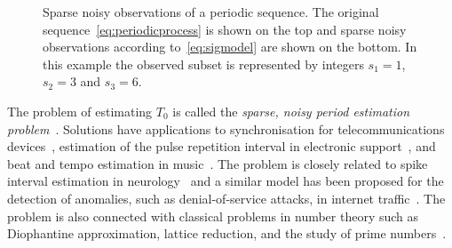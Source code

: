 \documentclass[10pt,twocolumn,twoside]{IEEEtran}
\begin{document}
{
\def\vertgap{2}
\def\ph{0.4}
\def\T{1.1}
\newcommand{\raxis}{\draw[->] (-0.25,0) -- (8,0) node[above] {$\reals$}; \draw (0,-0.06)-- node[below] {$0$} (0,0.06) }
\newcommand{\pulse}[1]{ \draw[->,>=latex] (#1,0) -- (#1,1) }
\newcommand{\pulsewithnode}[2]{ \draw[->,>=latex] (#1,0) -- node[right] {#2} (#1,1) }
\begin{figure}[t]
	\centering
{} 
		\caption{Sparse noisy observations of a periodic sequence.  The original sequence~\eqref{eq:periodicprocess} is shown on the top and sparse noisy observations according to~\eqref{eq:sigmodel} are shown on the bottom.  In this example the observed subset is represented by integers $s_1=1$, $s_2=3$ and $s_3=6$.}
		\label{fig_stat_model}
\end{figure}
}

The problem of estimating $T_0$ is called the \emph{sparse, noisy period estimation problem}~\cite{Clarkson2007,McKilliam2007}.  Solutions have applications to synchronisation for telecommunications devices~\cite{Fogel1988,Fogel1989_bit_synch_zero_crossings,Sidiropoulos2005,5621928}, estimation of the pulse repetition interval in electronic support~\cite{EltonGray_puilse_train_rader_1994,Gray_more_pri_1994,Clarkson_thesis,clarkson_estimate_period_pulse_train_1996,Hauochan_pri_2012}, and beat and tempo estimation in music~\cite{dixon_beat_extraction_2001}.  The problem is closely related to spike interval estimation in neurology~\cite{Arnett_neuro_pri_1976,Brillinger_spike_trains_1988,Rossoni200630} and a similar model has been proposed for the detection of anomalies, such as denial-of-service attacks, in internet traffic~\cite{He_detecting_periodic_patterns_in_internet_2006,5585849,5947313}.  The problem is also connected with classical problems in number theory such as Diophantine approximation, lattice reduction, and the study of prime numbers~\cite{Cassels_geom_numbers_1997,490557,Clarkson_thesis,Lenstra1982,Wubben_2011,536682,726812,CaseySadler_primes_2013}.
 
\end{document}
